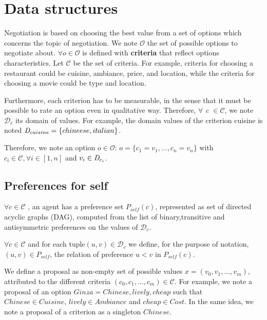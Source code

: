 \documentclass{article}
\begin{document}
		\title{\vskip -10pt}
		
		\author{Lydia Ould Ouali, Charles Rich \and
		Nicolas Sabouret }
		
	
	\section{Data structures}
	Negotiation is based on choosing the best value from a set of options which concerns the topic of negotiation. We note $\mathcal{O}$ the set of possible options to negotiate about. $\forall o \in \mathcal{O}$ is defined with \textbf{criteria} that reflect options characteristics.
	Let $\mathcal{C}$ be the set of criteria. For example, criteria for choosing a restaurant could be cuisine, ambiance, price, and location, while the criteria for choosing a movie could be type and location. 
	
	Furthermore, each criterion has to be measurable, in the sense that it must be possible to rate an option even in qualitative way. Therefore, $\forall$ \emph{c $\in\mathcal{ C}$},  we note $\mathcal{D}_c$ its  domain of values. For example, the domain  values of the criterion cuisine is noted $\emph{D}_{cuisine} = \{chineese, italian\}$.
	
	Therefore, we note an option $o\in \mathcal{O}$:
	$o = \{c_1=v_1,..., c_n=v_n\}$ with $c_i \in \mathcal{C}, \forall i \in [1,n]$ and $v_i\in \emph{D}_{c_i}$. 
	
	\subsection{Preferences for self}
	$\forall c \in \mathcal{C}$ , an agent has a preference set $P_{self}(c)$, represented as set of directed acyclic graphs (DAG), computed from the list of binary,transitive and antisymmetric preferences on the values of $\mathcal{D}_c$.
	
	$\forall c \in \mathcal{C}$ and for each tuple$ (u,v) \in \mathcal{D}_c$ we define, for the purpose of notation, $(u,v) \in P_{self}$, the relation of preference $u<v$ in  $P_{self}(c)$. 
	
	
	We define a proposal as non-empty set of possible values  $x=(v_0,v_1,\ldots,v_m)$, attributed to the different criteria  $(c_0,c_1,\ldots,c_m) \in \mathcal{C}$.
	For example, we note a proposal of an option $Ginza = Chinese, lively, cheap$ such that $Chinese \in Cuisine$, $lively \in Ambiance$ and $cheap \in Cost$. In the same idea, we note a proposal of a criterion as a singleton $Chinese$.
	
\end{document}

